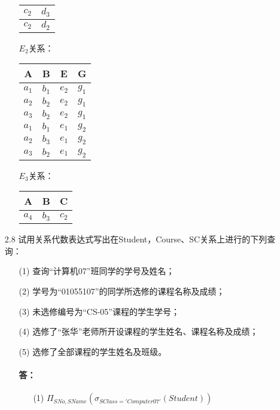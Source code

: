 \documentclass[UTF8]{ctexart}
\begin{document}
\begin{itemize}
\begin{enumerate}
\begin{table}[H]
\begin{tabular}{|c|c|}
				$c_{2}$ & $d_{3}$\\\hline	
								
				$c_{2}$ & $d_{2}$\\\hline					
			\end{tabular}
		\end{table}
	
		$E_{2}$关系：
		\begin{table}[H]
			\begin{tabular}{|c|c|c|c|}
				\hline
				A & B & E & G \\\hline
				$a_{1}$ & $b_{1}$ & $e_{2}$ & $g_{1}$ \\\hline
				$a_{2}$ & $b_{2}$ & $e_{2}$ & $g_{1}$ \\\hline
				$a_{3}$ & $b_{2}$ & $e_{2}$ & $g_{1}$ \\\hline
				$a_{1}$ & $b_{1}$ & $e_{1}$ & $g_{2}$ \\\hline
				$a_{2}$ & $b_{3}$ & $e_{1}$ & $g_{2}$ \\\hline
				$a_{3}$ & $b_{2}$ & $e_{1}$ & $g_{2}$ \\\hline
			\end{tabular}
		\end{table}
	
		$E_{3}$关系：
		\begin{table}[H]
			\begin{tabular}{|c|c|c|}
				\hline
				A & B & C \\\hline
				$a_{4}$ & $b_{3}$ & $c_{2}$ \\\hline
			\end{tabular}
		\end{table}
		
	\end{enumerate}

	\item[2.8] 试用关系代数表达式写出在Student，Course、SC关系上进行的下列查询：
	\begin{enumerate}
		\item[(1)] 查询“计算机07”班同学的学号及姓名；
		\item[(2)] 学号为“01055107”的同学所选修的课程名称及成绩；
		\item[(3)] 未选修编号为“CS-05”课程的学生学号；
		\item[(4)] 选修了“张华”老师所开设课程的学生姓名、课程名称及成绩；
		\item[(5)] 选修了全部课程的学生姓名及班级。
		
		\paragraph{答：}
		\begin{enumerate}
			\item[(1)] $\Pi_{SNo, SName}(\sigma_{SClass='Computer 07'}(Student))$
			

\end{enumerate}
\end{enumerate}
\end{itemize}
\end{document}
